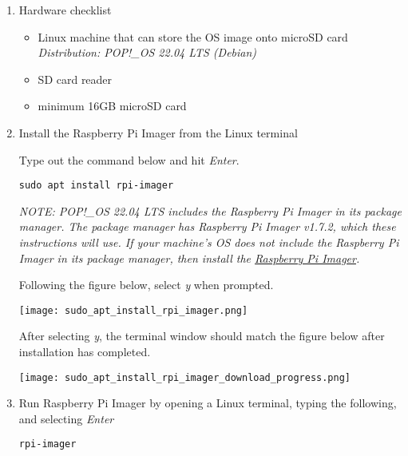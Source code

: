 \documentclass[journal]{IEEEtran}
\begin{document}
    \begin{enumerate}
        \item Hardware checklist
        
        \begin{itemize}
            \item Linux machine that can store the OS image onto microSD card \newline
                \emph{Distribution: POP!\_OS 22.04 LTS (Debian)}
            \item SD card reader
            \item minimum 16GB microSD card
        \end{itemize}
    
        \item Install the Raspberry Pi Imager from the Linux terminal \newline
        
        Type out the command below and hit \emph{Enter}. \newline

        \begin{lstlisting}[frame=single]
            sudo apt install rpi-imager
        \end{lstlisting}

        \emph{NOTE: POP!\_OS 22.04 LTS includes the Raspberry Pi Imager in its package manager. The package manager has Raspberry Pi Imager v1.7.2, which these instructions will use. If your machine's OS does not include the Raspberry Pi Imager in its package manager, then install the {\href{https://www.raspberrypi.com/software/}{Raspberry Pi Imager}}.} \newline

        Following the figure below, select \emph{y} when prompted. \newline

        \texttt{[image: sudo\_apt\_install\_rpi\_imager.png]}

        After selecting \emph{y}, the terminal window should match the figure below after installation has completed. \newline

        \texttt{[image: sudo\_apt\_install\_rpi\_imager\_download\_progress.png]}

        \item Run Raspberry Pi Imager by opening a Linux terminal, typing the following, and selecting \emph{Enter}
        
        \begin{lstlisting}[frame=single]
            rpi-imager
        \end{lstlisting}


\end{enumerate}
\end{document}
